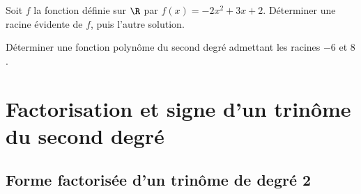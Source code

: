 \documentclass[11 pt, a4paper]{article}
\begin{document}
\bigskip
\bigskip
\bigskip
\bigskip
\bigskip

\begin{Ex}
Soit $f$ la fonction définie sur $\R$ par $f(x)=-2x^2+3x+2$. Déterminer une racine évidente de $f$, puis l'autre solution.
\end{Ex}

\bigskip
\bigskip

%
%
%


\begin{Ex}
Déterminer une fonction polynôme du second degré admettant les racines $-6$ et $8$.
\end{Ex}


\newpage

\section{Factorisation et signe d'un trinôme du second degré}

	\subsection{Forme factorisée d'un trinôme de degré 2}
\end{document}
